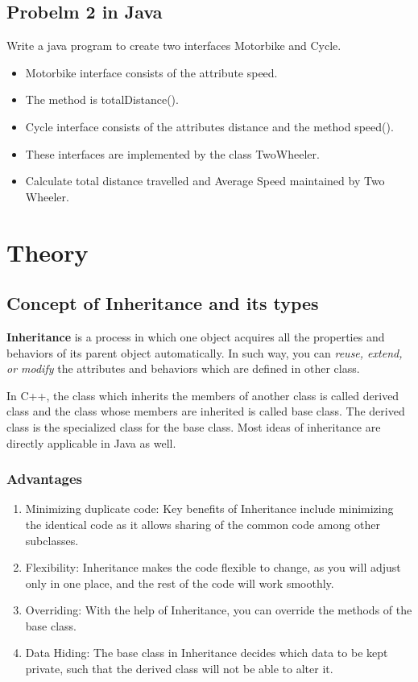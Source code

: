 \documentclass[11pt]{article}
\begin{document}
\subsection{Probelm 2 in Java}
Write a java program to create two interfaces Motorbike and Cycle.
\begin{itemize}
	\item Motorbike interface consists of the attribute speed.
	\item The method is totalDistance().
	\item Cycle interface consists of the attributes distance and the method speed().
	\item These interfaces are implemented by the class TwoWheeler.
	\item Calculate total distance travelled and Average Speed maintained by Two Wheeler.
\end{itemize}

\section{Theory}

\subsection{Concept of Inheritance and its types}
\textbf{Inheritance} is a process in which one object acquires all the properties and behaviors of its parent object automatically. In such way, you can \textit{reuse, extend, or modify} the attributes and behaviors which are defined in other class.

In C++, the class which inherits the members of another class is called derived class and the class whose members are inherited is called base class. The derived class is the specialized class for the base class. Most ideas of inheritance are directly applicable in Java as well. 


\subsubsection{Advantages}
\begin{enumerate}
	\item Minimizing duplicate code: Key benefits of Inheritance include minimizing the identical code as it allows sharing of the common code among other subclasses.

	\item Flexibility: Inheritance makes the code flexible to change, as you will adjust only in one place, and the rest of the code will work smoothly.

	\item Overriding: With the help of Inheritance, you can override the methods of the base class.

	\item Data Hiding: The base class in Inheritance decides which data to be kept private, such that the derived class will not be able to alter it.
\end{enumerate}
\end{document}
